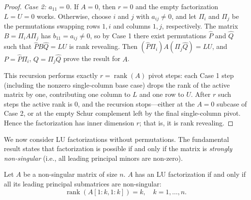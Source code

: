 \documentclass[10pt,twoside]{siamart1116}
\DeclareMathOperator{\rk}{rank}
\numberwithin{theorem}{section}
\begin{document}
\begin{proof}
  \emph{Case 2: $a_{11} = 0$.} If $A = 0$, then $r = 0$ and the empty factorization $L = U = 0$ works. Otherwise, choose $i$ and $j$ with $a_{ij} \neq 0$, and let $\Pi_i$ and $\Pi_j$ be the permutations swapping rows $1, i$ and columns $1, j$, respectively. The matrix $B = \Pi_i A \Pi_j$ has $b_{11} = a_{ij} \neq 0$, so by Case 1 there exist permutations $\widehat{P}$ and $\widehat{Q}$ such that $\widehat{P} B \widehat{Q} = LU$ is rank revealing. Then $(\widehat{P} \Pi_i) A (\Pi_j \widehat{Q}) = LU$, and $P = \widehat{P} \Pi_i$, $Q = \Pi_j \widehat{Q}$ prove the result for $A$.

  This recursion performs exactly $r=\rk(A)$ pivot steps: each Case 1 step (including the nonzero single-column base case) drops the rank of the active matrix by one, contributing one column to $L$ and one row to $U$. After $r$ such steps the active rank is $0$, and the recursion stops---either at the $A=0$ subcase of Case 2, or at the empty Schur complement left by the final single-column pivot. Hence the factorization has inner dimension $r$; that is, it is rank revealing. %
\end{proof}

We now consider LU factorizations without permutations. The fundamental result states that factorization is possible if and only if the matrix is \emph{strongly non-singular} (i.e., all leading principal minors are non-zero).

\begin{proposition}\label{prop:sufficient}
  Let $A$ be a non-singular matrix of size $n$. $A$ has an LU factorization if and only if all its leading principal submatrices are non-singular:
  \[
    \rk(A[1:k,1:k]) = k, \quad k = 1, \ldots, n.
  \]
\end{proposition}
\end{document}
